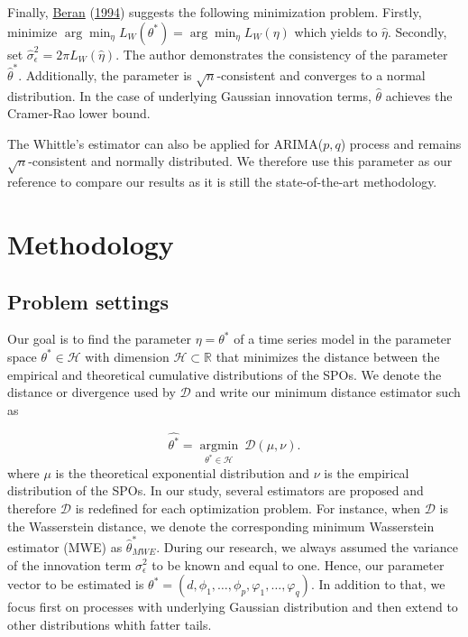 \documentclass[
  11pt,
]{article}
\begin{document}
Finally, \protect\hyperlink{ref-beran1994statistics}{Beran}
(\protect\hyperlink{ref-beran1994statistics}{1994}) suggests the
following minimization problem. Firstly, minimize
\(\arg \min _{\eta} L_{W}\left(\theta^{*}\right)=\arg \min _{\eta} L_{W}(\eta)\)
which yields to \(\hat{\eta}\). Secondly, set
\(\hat{\sigma}_{\epsilon}^{2}=2 \pi L_{W}(\hat{\eta}).\) The author
demonstrates the consistency of the parameter \(\hat \theta^*\).
Additionally, the parameter is \(\sqrt{n}\)-consistent and converges to
a normal distribution. In the case of underlying Gaussian innovation
terms, \(\hat \theta\) achieves the Cramer-Rao lower bound.

The Whittle's estimator can also be applied for ARIMA(\(p,q\)) process
and remains \(\sqrt{n}\)-consistent and normally distributed. We
therefore use this parameter as our reference to compare our results as
it is still the state-of-the-art methodology.

\hypertarget{methodology}{%
\section{Methodology}\label{methodology}}

\hypertarget{problem-settings}{%
\subsection{Problem settings}\label{problem-settings}}

Our goal is to find the parameter \(\eta = \theta^*\) of a time series
model in the parameter space \(\theta^* \in \mathcal{H}\) with dimension
\(\mathcal{H} \subset \mathbb{R}\) that minimizes the distance between
the empirical and theoretical cumulative distributions of the SPOs. We
denote the distance or divergence used by \(\mathcal{D}\) and write our
minimum distance estimator such as

\[\hat{\theta^*}=\underset{\theta^* \in \mathcal{H}}{\operatorname{argmin}} \ \mathcal{D}\left({\mu}, \nu\right) .\]
where \(\mu\) is the theoretical exponential distribution and \(\nu\) is
the empirical distribution of the SPOs. In our study, several estimators
are proposed and therefore \(\mathcal{D}\) is redefined for each
optimization problem. For instance, when \(\mathcal{D}\) is the
Wasserstein distance, we denote the corresponding minimum Wasserstein
estimator (MWE) as \(\hat \theta^*_{MWE}\). During our research, we
always assumed the variance of the innovation term \(\sigma^2_\epsilon\)
to be known and equal to one. Hence, our parameter vector to be
estimated is
\(\theta^* = (d, \phi_{1}, \ldots, \phi_{p}, \varphi_{1}, \ldots, \varphi_{q})\).
In addition to that, we focus first on processes with underlying
Gaussian distribution and then extend to other distributions whith
fatter tails.
\end{document}
